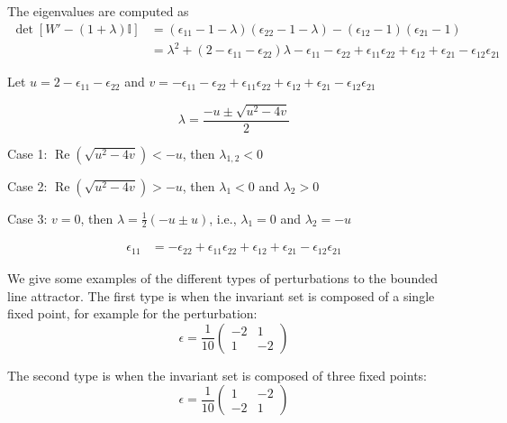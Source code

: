 \documentclass{article} %
\newcounter{ct}
\theoremstyle{definition}
\theoremstyle{remark}
\begin{document}
The eigenvalues are computed as
\begin{align*}
\det [W' -(1+\lambda)\mathbb{I}] &= (\epsilon_{11}-1-\lambda)(\epsilon_{22}-1-\lambda)-(\epsilon_{12}-1)(\epsilon_{21}-1)\\
&=\lambda^2 + (2-\epsilon_{11}-\epsilon_{22})\lambda -\epsilon_{11}-\epsilon_{22}+\epsilon_{11}\epsilon_{22} +\epsilon_{12} + \epsilon_{21} - \epsilon_{12}\epsilon_{21}
\end{align*}

Let 
$u=2-\epsilon_{11}-\epsilon_{22}$
and 
$v=-\epsilon_{11}-\epsilon_{22}+\epsilon_{11}\epsilon_{22} + \epsilon_{12} + \epsilon_{21} - \epsilon_{12}\epsilon_{21}$

\begin{equation}
\lambda = \frac{-u \pm \sqrt{u^2-4v}}{2}
\end{equation}



Case 1: $\operatorname{Re}(\sqrt{u^2-4v})<-u$, then 
$\lambda_{1,2}<0$


Case 2:  $\operatorname{Re}(\sqrt{u^2-4v})>-u$, then 
$\lambda_{1}<0$ and $\lambda_{2}>0$


Case 3: $v=0$, then 
$\lambda=\tfrac{1}{2}(-u\pm u)$, i.e.,
$\lambda_1=0$ and  $\lambda_2=-u$

\begin{align}
\epsilon_{11} &= -\epsilon_{22}+\epsilon_{11}\epsilon_{22} + \epsilon_{12} + \epsilon_{21} - \epsilon_{12}\epsilon_{21}
\end{align}



We give some examples of the different types of perturbations to the bounded line attractor.
The first type is when the invariant set is composed of a single fixed point, for example for the perturbation:
\begin{equation}
\epsilon = \frac{1}{10}
\begin{pmatrix}
-2  &  1 \\
 1   &  -2
\end{pmatrix}
\end{equation}



The second type is when the invariant set is composed of three fixed points:
\begin{equation}
\epsilon = \frac{1}{10}
\begin{pmatrix}
1  &  -2 \\
 -2  &  1
\end{pmatrix}
\end{equation}
\end{document}
